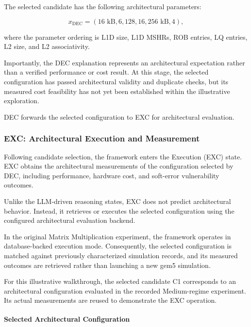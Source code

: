 The selected candidate has the following
architectural parameters:

\begin{equation}
x_{\mathrm{DEC}}
=
\left(
16\text{ kB},
6,
128,
16,
256\text{ kB},
4
\right),
\label{eq:illustrative_dec_design}
\end{equation}

where the parameter ordering is L1D size,
L1D MSHRs, ROB entries, LQ entries,
L2 size, and L2 associativity.

Importantly, the DEC explanation represents
an architectural expectation rather than
a verified performance or cost result.
At this stage, the selected configuration
has passed architectural validity and
duplicate checks, but its measured
cost feasibility has not yet been established
within the illustrative exploration.

DEC forwards the selected configuration
to EXC for architectural evaluation.



\subsubsection{EXC: Architectural Execution and Measurement}
\label{app:illustrative_exc}

Following candidate selection, the framework enters
the Execution (EXC) state. EXC obtains the
architectural measurements of the configuration
selected by DEC, including performance, hardware
cost, and soft-error vulnerability outcomes.

Unlike the LLM-driven reasoning states, EXC does
not predict architectural behavior. Instead, it
retrieves or executes the selected configuration
using the configured architectural evaluation
backend.

In the original Matrix Multiplication experiment,
the framework operates in database-backed execution
mode. Consequently, the selected configuration is
matched against previously characterized simulation
records, and its measured outcomes are retrieved
rather than launching a new gem5 simulation.

For this illustrative walkthrough, the selected
candidate C1 corresponds to an architectural
configuration evaluated in the recorded
Medium-regime experiment. Its actual measurements
are reused to demonstrate the EXC operation.

\paragraph{Selected Architectural Configuration}

